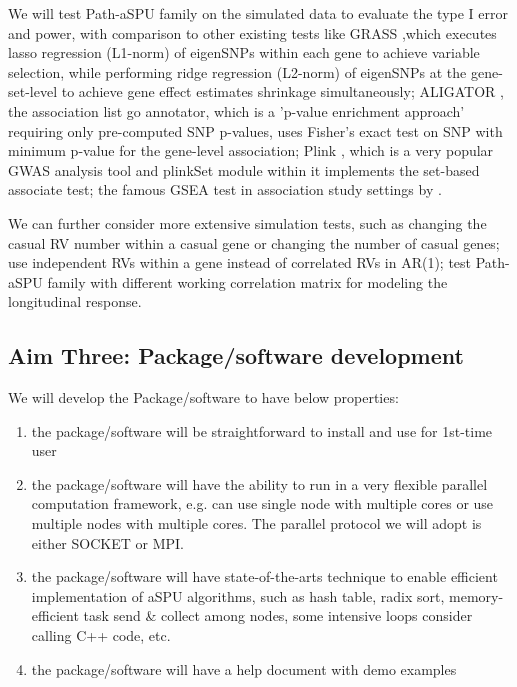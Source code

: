 \documentclass[12pt]{article}
\begin{document}
We will test Path-aSPU family on the simulated data to evaluate the type I error and power, with comparison to other existing tests like GRASS \cite{Chen2010},which executes lasso regression (L1-norm) of eigenSNPs within each gene to achieve variable selection, while performing ridge regression (L2-norm) of eigenSNPs at the gene-set-level to achieve gene effect estimates shrinkage simultaneously; ALIGATOR \cite{Holmans2009}, the association list go annotator, which is a 'p-value enrichment approach' requiring only pre-computed SNP p-values, uses Fisher's exact test on SNP with minimum p-value for the gene-level association; Plink \cite{Purcell2007}, which is a very popular GWAS analysis tool and plinkSet module within it implements the set-based associate test; the famous GSEA test in association study settings by \cite{wang2007pathway}.

We can further consider more extensive simulation tests, such as changing the casual RV number within a casual gene or changing the number of casual genes; use independent RVs within a gene instead of correlated RVs in AR(1); test Path-aSPU family with different working correlation matrix for modeling the longitudinal response. 


\subsection{Aim Three: Package/software development}
\label{sec:aim3}
We will develop the Package/software to have below properties:
\begin{enumerate}
\item the package/software will be straightforward to install and use for 1st-time user
\item the package/software will have the ability to run in a very flexible parallel computation framework, e.g. can use single node with multiple cores or use multiple nodes with multiple cores. The parallel protocol we will adopt is either SOCKET or MPI.
\item the package/software will have state-of-the-arts technique to enable efficient implementation of aSPU algorithms, such as hash table, radix sort, memory-efficient task send \& collect among nodes, some intensive loops consider calling C++ code, etc. 
\item the package/software will have a help document with demo examples
\end{enumerate}
\end{document}
